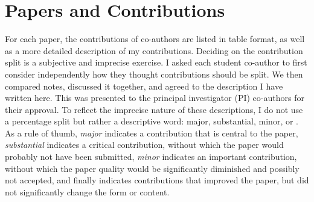\section{Papers and Contributions}
For each paper, the contributions of co-authors are listed in table format, as well as a more detailed description of my contributions. Deciding on the contribution split is a subjective and imprecise exercise. I asked each student co-author to first consider independently how they thought contributions should be split. We then compared notes, discussed it together, and agreed to the description I have written here. This was presented to the principal investigator (PI) co-authors for their approval. To reflect the imprecise nature of these descriptions, I do not use a percentage split but rather a descriptive word: major, substantial, minor, or \negdot. As a rule of thumb, \emph{major} indicates a contribution that is central to the paper, \emph{substantial} indicates a critical contribution, without which the paper would probably not have been submitted, \emph{minor} indicates an important contribution, without which the paper quality would be significantly diminished and possibly not accepted, and finally \emph{\negligible} indicates contributions that improved the paper, but did not significantly change the form or content.

